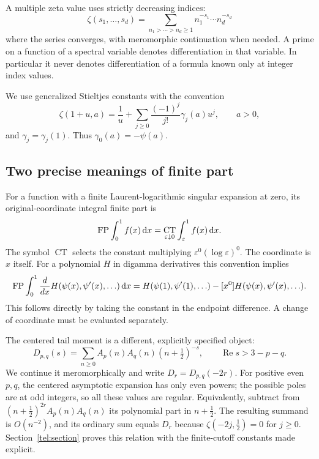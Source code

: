 \documentclass[11pt,letterpaper]{article}
\numberwithin{equation}{section}
\theoremstyle{plain}
\theoremstyle{definition}
\theoremstyle{remark}
\newcommand{\dd}{\,\mathrm d}\newcommand{\iu}{\mathrm i}
\DeclareMathOperator{\CT}{CT}\DeclareMathOperator{\Res}{Res}
\newcommand{\re}{\operatorname{Re}}\newcommand{\im}{\operatorname{Im}}
\begin{document}
A multiple zeta value uses strictly decreasing indices:
\[
 \zeta(s_1,\ldots,s_d)=
 \sum_{n_1>\cdots>n_d\ge1}
       n_1^{-s_1}\cdots n_d^{-s_d}
\]
where the series converges, with meromorphic continuation when needed.
A prime on a function of a spectral variable denotes differentiation
in that variable. In particular it never denotes differentiation of a
formula known only at integer index values.

We use generalized Stieltjes constants with the convention
\begin{equation}\label{scope:stieltjes}
 \zeta(1+u,a)=\frac1u+
       \sum_{j\ge0}\frac{(-1)^j}{j!}\gamma_j(a)u^j,
 \qquad a>0,
\end{equation}
and $\gamma_j=\gamma_j(1)$. Thus $\gamma_0(a)=-\psi(a)$.

\subsection{Two precise meanings of finite part}

For a function with a finite Laurent-logarithmic singular expansion at
zero, its original-coordinate integral finite part is
\begin{equation}\label{scope:fp}
 \FP\int_0^1f(x)\dd x
 =\CT_{\varepsilon\downarrow0}
             \int_\varepsilon^1f(x)\dd x.
\end{equation}
The symbol $\CT$ selects the constant multiplying
$\varepsilon^0(\log\varepsilon)^0$. The coordinate is $x$ itself.
For a polynomial $H$ in digamma derivatives this convention implies
\begin{equation}\label{scope:boundary}
 \FP\int_0^1\frac{d}{dx}H(\psi(x),\psi'(x),\ldots)\dd x
 =H(\psi(1),\psi'(1),\ldots)
   -[x^0]H(\psi(x),\psi'(x),\ldots).
\end{equation}
This follows directly by taking the constant in the endpoint difference.
A change of coordinate must be evaluated separately.

The centered tail moment is a different, explicitly specified object:
\begin{equation}\label{scope:centered}
 D_{p,q}(s)=\sum_{n\ge0}
       A_p(n)A_q(n)(n+\tfrac12)^{-s},
 \qquad \re s>3-p-q.
\end{equation}
We continue it meromorphically and write
$D_r=D_{p,q}(-2r)$. For positive even $p,q$, the centered asymptotic
expansion has only even powers; the possible poles are at odd
integers, so all these values are regular. Equivalently, subtract
from $(n+\tfrac12)^{2r}A_p(n)A_q(n)$ its polynomial part in
$n+\tfrac12$. The resulting summand is $O(n^{-2})$, and its ordinary
sum equals $D_r$ because
$\zeta(-2j,\tfrac12)=0$ for $j\ge0$. Section~\ref{tel:section}
proves this relation with the finite-cutoff constants made explicit.
\end{document}

